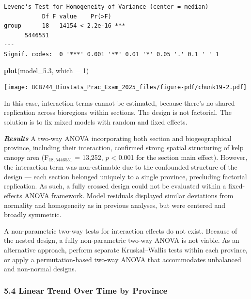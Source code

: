 \documentclass[
  british,
  10pt,
]{article}
\newenvironment{Shaded}{\begin{snugshade}}{\end{snugshade}}
\newcommand{\AttributeTok}[1]{\textcolor[rgb]{0.13,0.29,0.53}{#1}}
\newcommand{\DecValTok}[1]{\textcolor[rgb]{0.00,0.00,0.81}{#1}}
\newcommand{\FloatTok}[1]{\textcolor[rgb]{0.00,0.00,0.81}{#1}}
\newcommand{\FunctionTok}[1]{\textcolor[rgb]{0.13,0.29,0.53}{\textbf{#1}}}
\newcommand{\NormalTok}[1]{#1}
\let\oldtexttt\texttt
\renewcommand{\texttt}[1]{\oldtexttt{\small #1}}
\begin{document}
\begin{verbatim}
Levene's Test for Homogeneity of Variance (center = median)
           Df F value    Pr(>F)    
group      18   14154 < 2.2e-16 ***
      5446551                      
---
Signif. codes:  0 '***' 0.001 '**' 0.01 '*' 0.05 '.' 0.1 ' ' 1
\end{verbatim}

\begin{Shaded}
\begin{Highlighting}[]
\FunctionTok{plot}\NormalTok{(model\_5}\FloatTok{.3}\NormalTok{, }\AttributeTok{which =} \DecValTok{1}\NormalTok{)}
\end{Highlighting}
\end{Shaded}

\begin{center}
\texttt{[image: BCB744\_Biostats\_Prac\_Exam\_2025\_files/figure-pdf/chunk19-2.pdf]}
\end{center}

In this case, interaction terms cannot be estimated, because there's no
shared replication across bioregions within sections. The design is not
factorial. The solution is to fix mixed models with random and fixed
effects.

\textbf{\emph{Results}} A two-way ANOVA incorporating both section and
biogeographical province, including their interaction, confirmed strong
spatial structuring of kelp canopy area (F\(_{18,5446551}\) = 13,252,
\emph{p} \textless{} 0.001 for the section main effect). However, the
interaction term was non-estimable due to the confounded structure of
the design --- each section belonged uniquely to a single province,
precluding factorial replication. As such, a fully crossed design could
not be evaluated within a fixed-effects ANOVA framework. Model residuals
displayed similar deviations from normality and homogeneity as in
previous analyses, but were centered and broadly symmetric.

A non-parametric two-way tests for interaction effects do not exist.
Because of the nested design, a fully non-parametric two-way ANOVA is
not viable. As an alternative approach, perform separate Kruskal--Wallis
tests within each province, or apply a permutation-based two-way ANOVA
that accommodates unbalanced and non-normal designs.

\subsubsection{5.4 Linear Trend Over Time by
Province}\label{linear-trend-over-time-by-province}
\end{document}
